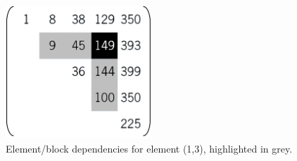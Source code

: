 \documentclass[../thesis]{subfiles}
\begin{document}
	\begin{figure}[htp]
		\centering
		\includegraphics[height=5cm]{assets/images/case/dependencies.png}
		\caption[Element/block dependencies.]{Element/block dependencies for element (1,3), highlighted in grey.}
	\end{figure}
\end{document}
